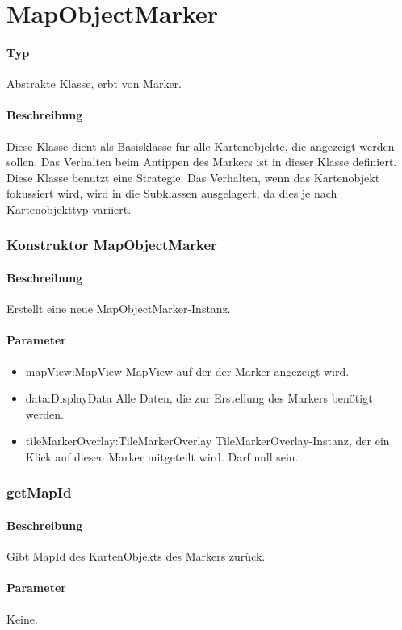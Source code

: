 \section{MapObjectMarker}
\paragraph*{Typ}
Abstrakte Klasse, erbt von Marker.
\paragraph*{Beschreibung}
Diese Klasse dient als Basisklasse für alle Kartenobjekte, die angezeigt werden sollen.
Das Verhalten beim Antippen des Markers ist in dieser Klasse definiert.
Diese Klasse benutzt eine Strategie. Das Verhalten, wenn das Kartenobjekt fokussiert wird,
wird in die Subklassen ausgelagert, da dies je nach Kartenobjekttyp variiert.

\subsubsection{Konstruktor MapObjectMarker}%
\paragraph*{Beschreibung}
Erstellt eine neue MapObjectMarker-Instanz.
\paragraph*{Parameter}
\begin{itemize}
    \item mapView:MapView MapView auf der der Marker angezeigt wird.
    \item data:DisplayData Alle Daten, die zur Erstellung des Markers benötigt werden.
    \item tileMarkerOverlay:TileMarkerOverlay TileMarkerOverlay-Instanz, der ein Klick 
    auf diesen Marker mitgeteilt wird. Darf null sein.
\end{itemize}

\subsubsection{getMapId}%
\paragraph*{Beschreibung}
Gibt MapId des KartenObjekts des Markers zurück.
\paragraph*{Parameter}
Keine.
